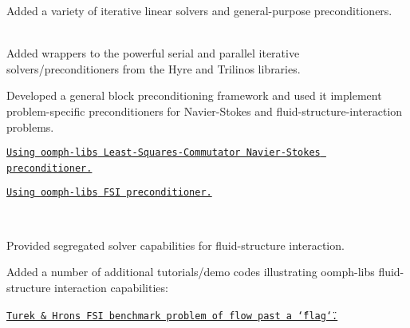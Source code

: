 \begin{DoxyItemize}
\item Added a variety of iterative linear solvers and general-\/purpose preconditioners. ~\newline
~\newline

\item Added wrappers to the powerful serial and parallel iterative solvers/preconditioners from the Hyre and Trilinos libraries. ~\newline
~\newline

\item Developed a general block preconditioning framework and used it implement problem-\/specific preconditioners for Navier-\/\+Stokes and fluid-\/structure-\/interaction problems. ~\newline
~\newline

\begin{DoxyItemize}
\item \href{../../preconditioners/lsc_navier_stokes/html/index.html}{\tt Using {\ttfamily oomph-\/lib\textquotesingle{}s} Least-\/\+Squares-\/\+Commutator Navier-\/\+Stokes preconditioner.} ~\newline
~\newline

\item \href{../../preconditioners/fsi/html/index.html}{\tt Using {\ttfamily oomph-\/lib\textquotesingle{}s} F\+SI preconditioner.}
\end{DoxyItemize}~\newline
~\newline

\item Provided segregated solver capabilities for fluid-\/structure interaction. ~\newline
~\newline

\item Added a number of additional tutorials/demo codes illustrating {\ttfamily oomph-\/lib\textquotesingle{}s} fluid-\/structure interaction capabilities\+: ~\newline
~\newline

\begin{DoxyItemize}
\item \href{../../interaction/turek_flag/html/index.html}{\tt Turek \& Hron\textquotesingle{}s F\+SI benchmark problem of flow past a \char`\"{}flag\char`\"{}.} ~\newline
~\newline


\end{DoxyItemize}
\end{DoxyItemize}
